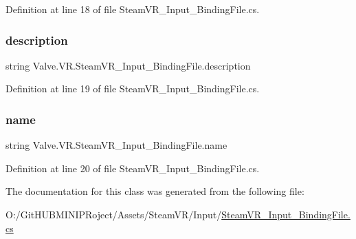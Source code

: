 Definition at line 18 of file Steam\+V\+R\+\_\+\+Input\+\_\+\+Binding\+File.\+cs.

\mbox{\label{class_valve_1_1_v_r_1_1_steam_v_r___input___binding_file_a0e8f9a0cf9df9f64863555e46cebc2c1}} 
\subsubsection{\texorpdfstring{description}{description}}
{\footnotesize\ttfamily string Valve.\+V\+R.\+Steam\+V\+R\+\_\+\+Input\+\_\+\+Binding\+File.\+description}



Definition at line 19 of file Steam\+V\+R\+\_\+\+Input\+\_\+\+Binding\+File.\+cs.

\mbox{\label{class_valve_1_1_v_r_1_1_steam_v_r___input___binding_file_a14c3d3fecbaecc6f23557b15f70ef232}} 
\subsubsection{\texorpdfstring{name}{name}}
{\footnotesize\ttfamily string Valve.\+V\+R.\+Steam\+V\+R\+\_\+\+Input\+\_\+\+Binding\+File.\+name}



Definition at line 20 of file Steam\+V\+R\+\_\+\+Input\+\_\+\+Binding\+File.\+cs.



The documentation for this class was generated from the following file\+:\begin{DoxyCompactItemize}
\item 
O\+:/\+Git\+H\+U\+B\+M\+I\+N\+I\+P\+Roject/\+Assets/\+Steam\+V\+R/\+Input/\mbox{\hyperlink{_steam_v_r___input___binding_file_8cs}{Steam\+V\+R\+\_\+\+Input\+\_\+\+Binding\+File.\+cs}}\end{DoxyCompactItemize}
